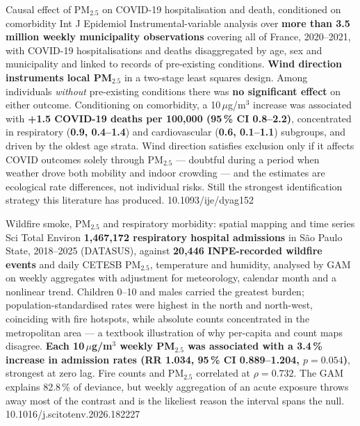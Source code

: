 \documentclass[10pt]{article}
\begin{document}
{Causal effect of PM$_{2.5}$ on COVID-19 hospitalisation and death, conditioned on comorbidity}
{Int J Epidemiol}
{Instrumental-variable analysis over \textbf{more than 3.5 million weekly municipality
observations} covering all of France, 2020--2021, with COVID-19 hospitalisations and
deaths disaggregated by age, sex and municipality and linked to records of pre-existing
conditions. \textbf{Wind direction instruments local PM$_{2.5}$} in a two-stage least
squares design. Among individuals \emph{without} pre-existing conditions there was
\textbf{no significant effect} on either outcome. Conditioning on comorbidity, a
10\,$\mu$g/m$^3$ increase was associated with \textbf{+1.5 COVID-19 deaths per 100{,}000
(95\,\% CI 0.8--2.2)}, concentrated in respiratory (\textbf{0.9, 0.4--1.4}) and
cardiovascular (\textbf{0.6, 0.1--1.1}) subgroups, and driven by the oldest age strata.
Wind direction satisfies exclusion only if it affects COVID outcomes solely through
PM$_{2.5}$ --- doubtful during a period when weather drove both mobility and indoor
crowding --- and the estimates are ecological rate differences, not individual risks.
Still the strongest identification strategy this literature has produced.}
{10.1093/ije/dyag152}

{Wildfire smoke, PM$_{2.5}$ and respiratory morbidity: spatial mapping and time series}
{Sci Total Environ}
{\textbf{1{,}467{,}172 respiratory hospital admissions} in S\~ao Paulo State, 2018--2025
(DATASUS), against \textbf{20{,}446 INPE-recorded wildfire events} and daily CETESB
PM$_{2.5}$, temperature and humidity, analysed by GAM on weekly aggregates with adjustment
for meteorology, calendar month and a nonlinear trend. Children 0--10 and males carried
the greatest burden; population-standardised rates were highest in the north and
north-west, coinciding with fire hotspots, while absolute counts concentrated in the
metropolitan area --- a textbook illustration of why per-capita and count maps disagree.
\textbf{Each 10\,$\mu$g/m$^3$ weekly PM$_{2.5}$ was associated with a 3.4\,\% increase in
admission rates (RR 1.034, 95\,\% CI 0.889--1.204, $p = 0.054$)}, strongest at zero lag.
Fire counts and PM$_{2.5}$ correlated at $\rho = 0.732$. The GAM explains 82.8\,\% of
deviance, but weekly aggregation of an acute exposure throws away most of the contrast
and is the likeliest reason the interval spans the null.}
{10.1016/j.scitotenv.2026.182227}

\end{document}
